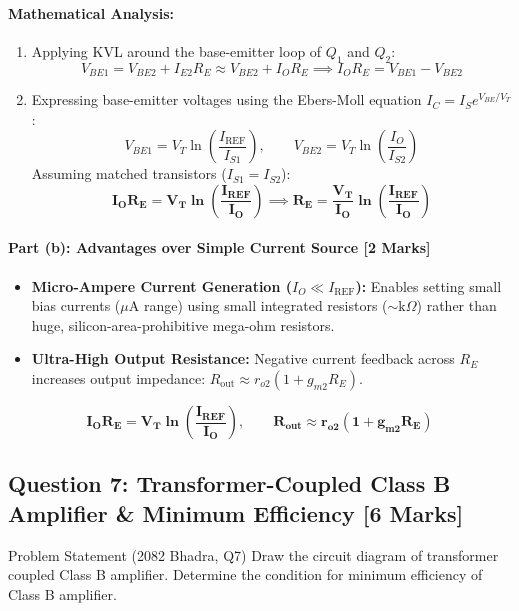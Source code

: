 \documentclass[11pt,a4paper,oneside]{book}
\begin{document}
\paragraph{Mathematical Analysis:}
\begin{enumerate}[leftmargin=1.5em]
  \item Applying KVL around the base-emitter loop of $Q_1$ and $Q_2$:
  \[
  V_{BE1} = V_{BE2} + I_{E2} R_E \approx V_{BE2} + I_O R_E \implies I_O R_E = V_{BE1} - V_{BE2}
  \]
  \item Expressing base-emitter voltages using the Ebers-Moll equation $I_C = I_S e^{V_{BE}/V_T}$:
  \[
  V_{BE1} = V_T \ln\left(\frac{I_{\text{REF}}}{I_{S1}}\right), \qquad V_{BE2} = V_T \ln\left(\frac{I_O}{I_{S2}}\right)
  \]
  Assuming matched transistors ($I_{S1} = I_{S2}$):
  \[
  \mathbf{I_O R_E = V_T \ln\left(\frac{I_{\text{REF}}}{I_O}\right) \implies R_E = \frac{V_T}{I_O} \ln\left(\frac{I_{\text{REF}}}{I_O}\right)}
  \]
\end{enumerate}

\paragraph{Part (b): Advantages over Simple Current Source [2 Marks]}
\begin{itemize}[leftmargin=1.5em]
  \item \textbf{Micro-Ampere Current Generation ($I_O \ll I_{\text{REF}}$):} Enables setting small bias currents ($\mu\text{A}$ range) using small integrated resistors ($\sim \text{k}\Omega$) rather than huge, silicon-area-prohibitive mega-ohm resistors.
  \item \textbf{Ultra-High Output Resistance:} Negative current feedback across $R_E$ increases output impedance: $R_{\text{out}} \approx r_{o2}(1 + g_{m2} R_E)$.
\end{itemize}

\begin{answerbox}
$$\mathbf{I_O R_E = V_T \ln\left(\frac{I_{\text{REF}}}{I_O}\right), \qquad R_{\text{out}} \approx r_{o2}(1 + g_{m2} R_E)}$$
\end{answerbox}

\vspace{0.6cm}

\subsection{Question 7: Transformer-Coupled Class B Amplifier \& Minimum Efficiency [6 Marks]}
\begin{questionbox}{Problem Statement (2082 Bhadra, Q7)}
Draw the circuit diagram of transformer coupled Class B amplifier. Determine the condition for minimum efficiency of Class B amplifier.
\end{questionbox}
\end{document}

